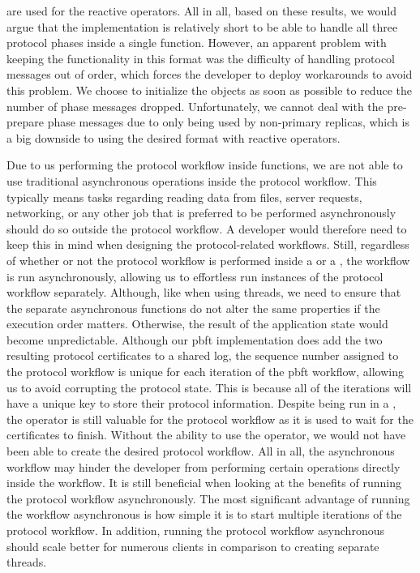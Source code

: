 are used for the reactive operators. All in all, based on these results, we would argue that the implementation is relatively short to be able to handle all three protocol phases inside a single function. However, an apparent problem with keeping the functionality in this format was the difficulty of handling protocol messages out of order, which forces the developer to deploy workarounds to avoid this problem. We choose to initialize the  objects as soon as possible to reduce the number of phase messages dropped. Unfortunately, we cannot deal with the pre-prepare phase messages due to only being used by non-primary replicas, which is a big downside to using the desired format with reactive operators.

Due to us performing the protocol workflow inside  functions, we are not able to use traditional asynchronous operations inside the protocol workflow. This typically means tasks regarding reading data from files, server requests, networking, or any other job that is preferred to be performed asynchronously should do so outside the protocol workflow. A developer would therefore need to keep this in mind when designing the protocol-related workflows. Still, regardless of whether or not the protocol workflow is performed inside a  or a , the workflow is run asynchronously, allowing us to effortless run instances of the protocol workflow separately. Although, like when using threads, we need to ensure that the separate asynchronous functions do not alter the same properties if the execution order matters. Otherwise, the result of the application state would become unpredictable. Although our \ac{pbft} implementation does add the two resulting protocol certificates to a shared log, the sequence number assigned to the protocol workflow is unique for each iteration of the \ac{pbft} workflow, allowing us to avoid corrupting the protocol state. This is because all of the iterations will have a unique key to store their protocol information. Despite being run in a , the  operator is still valuable for the protocol workflow as it is used to wait for the certificates to finish. Without the ability to use the  operator, we would not have been able to create the desired protocol workflow.
All in all, the asynchronous workflow may hinder the developer from performing certain operations directly inside the workflow. It is still beneficial when looking at the benefits of running the protocol workflow asynchronously. The most significant advantage of running the workflow asynchronous is how simple it is to start multiple iterations of the protocol workflow. In addition, running the protocol workflow asynchronous should scale better for numerous clients in comparison to creating separate threads.

